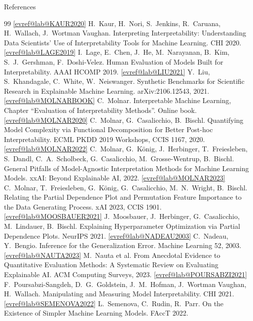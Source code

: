 \documentclass[10pt,compress,t,notes=noshow,xcolor=table]{beamer}
\makeatletter
\def\endlecture{}
\newcommand{\citeref}[1]{%
  \href{\csname evref@url@#1\endcsname}{[\csname evref@lab@#1\endcsname]}}
\makeatother
\begin{document}
{\begin{frame}[allowframebreaks]{References}
\begin{thebibliography}{99}
 \citeref{KAUR2020} H.~Kaur, H.~Nori, S.~Jenkins, R.~Caruana, H.~Wallach, J.~Wortman Vaughan. Interpreting Interpretability: Understanding Data Scientists' Use of Interpretability Tools for Machine Learning. CHI 2020.
 \citeref{LAGE2019} I.~Lage, E.~Chen, J.~He, M.~Narayanan, B.~Kim, S.~J.~Gershman, F.~Doshi-Velez. Human Evaluation of Models Built for Interpretability. AAAI HCOMP 2019.
 \citeref{LIU2021} Y.~Liu, S.~Khandagale, C.~White, W.~Neiswanger. Synthetic Benchmarks for Scientific Research in Explainable Machine Learning. arXiv:2106.12543, 2021.
 \citeref{MOLNARBOOK} C.~Molnar. Interpretable Machine Learning, Chapter ``Evaluation of Interpretability Methods''. Online book.
 \citeref{MOLNAR2020} C.~Molnar, G.~Casalicchio, B.~Bischl. Quantifying Model Complexity via Functional Decomposition for Better Post-hoc Interpretability. ECML PKDD 2019 Workshops, CCIS 1167, 2020.
 \citeref{MOLNAR2022} C.~Molnar, G.~K\"onig, J.~Herbinger, T.~Freiesleben, S.~Dandl, C.~A.~Scholbeck, G.~Casalicchio, M.~Grosse-Wentrup, B.~Bischl. General Pitfalls of Model-Agnostic Interpretation Methods for Machine Learning Models. xxAI: Beyond Explainable AI, 2022.
 \citeref{MOLNAR2023} C.~Molnar, T.~Freiesleben, G.~K\"onig, G.~Casalicchio, M.~N.~Wright, B.~Bischl. Relating the Partial Dependence Plot and Permutation Feature Importance to the Data Generating Process. xAI 2023, CCIS 1901.
 \citeref{MOOSBAUER2021} J.~Moosbauer, J.~Herbinger, G.~Casalicchio, M.~Lindauer, B.~Bischl. Explaining Hyperparameter Optimization via Partial Dependence Plots. NeurIPS 2021.
 \citeref{NADEAU2003} C.~Nadeau, Y.~Bengio. Inference for the Generalization Error. Machine Learning 52, 2003.
 \citeref{NAUTA2023} M.~Nauta et al. From Anecdotal Evidence to Quantitative Evaluation Methods: A Systematic Review on Evaluating Explainable AI. ACM Computing Surveys, 2023.
 \citeref{POURSABZI2021} F.~Poursabzi-Sangdeh, D.~G.~Goldstein, J.~M.~Hofman, J.~Wortman Vaughan, H.~Wallach. Manipulating and Measuring Model Interpretability. CHI 2021.
 \citeref{SEMENOVA2022} L.~Semenova, C.~Rudin, R.~Parr. On the Existence of Simpler Machine Learning Models. FAccT 2022.
\end{thebibliography}
\end{frame}
}



\endlecture
\end{document}
